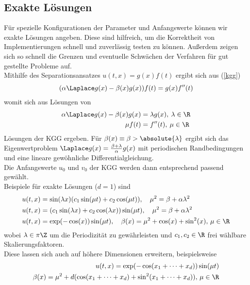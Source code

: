 \subsection{Exakte Lösungen}
Für spezielle Konfigurationen der Parameter und Anfangswerte können wir exakte Lösungen angeben. Diese sind hilfreich, um die Korrektheit von Implementierungen schnell und zuverlässig testen zu können. Außerdem zeigen sich so schnell die Grenzen und eventuelle Schwächen der Verfahren für gut gestellte Probleme auf.\\[1cm]
Mithilfe des Separationsansatzes $u(t,x)=g(x)f(t)$ ergibt sich aus (\ref{kgg}) 
\begin{equation*}
(\alpha\Laplace g(x)-\beta(x)g(x))f(t) = g(x)f''(t)
\end{equation*}
womit sich aus Lösungen von
\begin{align*}
\alpha\Laplace g(x)-\beta(x)g(x)&=\lambda g(x), \: \lambda\in\R\\
\mu f(t)&=f''(t), \: \mu\in \R
\end{align*}
Lösungen der KGG ergeben. Für $\beta(x) \equiv \beta>\absolute{\lambda}$ ergibt sich das Eigenwertproblem $\Laplace g(x)=\frac{\beta + \lambda}{\alpha}g(x)$ mit periodischen Randbedingungen und eine lineare gewöhnliche Differentialgleichung.\\Die Anfangswerte $u_0$ und $v_0$ der KGG werden dann entsprechend passend gewählt.\\[1cm]
Beispiele für exakte Lösungen ($d=1$) sind
\begin{align*}
u(t,x)&=\sin(\lambda x)(c_1 \sin(\mu t) + c_2 \cos(\mu t)), \quad \mu^2=\beta+\alpha \lambda^2\\ 
u(t,x)&=(c_1 \sin(\lambda x) + c_2 \cos(\lambda x))\sin(\mu t), \quad \mu^2=\beta+\alpha \lambda^2\\
u(t,x)&=\exp(-\cos(x))\sin(\mu t), \quad \beta(x)=\mu^2+\cos(x)+\sin^2(x), \, \mu \in \R
\end{align*}
wobei $\lambda\in \pi\Z$ um die Periodizität zu gewährleisten und $c_1, c_2 \in \R$ frei wählbare Skalierungsfaktoren.\\
Diese lassen sich auch auf höhere Dimensionen erweitern, beispielsweise
\begin{eqnarray}
u(t,x)=\exp(-\cos(x_1+\dots+x_d))\sin(\mu t)\\
\beta(x)=\mu^2+d(\cos(x_1+\dots+x_d)+\sin^2(x_1+\dots+x_d)), \, \mu\in\R \nonumber
\end{eqnarray}


